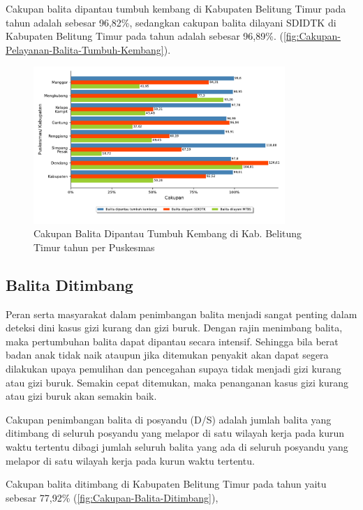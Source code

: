 Cakupan balita dipantau tumbuh kembang di Kabupaten Belitung Timur pada tahun \tP adalah sebesar 96,82\%, sedangkan cakupan balita dilayani SDIDTK di Kabupaten Belitung Timur pada tahun \tP adalah sebesar 96,89\%. (\autoref{fig:Cakupan-Pelayanan-Balita-Tumbuh-Kembang}).

\begin{figure}[H]
	\centering
	\includegraphics[width=0.85\textwidth]{bab_05/bab_05_23_balitaTumbuhKembang}
	\caption{Cakupan Balita Dipantau Tumbuh Kembang di Kab. Belitung Timur tahun \tP per Puskesmas}
	\label{fig:Cakupan-Pelayanan-Balita-Tumbuh-Kembang}
\end{figure}

\subsection{Balita Ditimbang}
\label{subsec:Balita-Ditimbang}
Peran serta masyarakat dalam penimbangan balita menjadi sangat penting
dalam deteksi dini kasus gizi kurang dan gizi buruk. Dengan rajin
menimbang balita, maka pertumbuhan balita dapat dipantau secara intensif.
Sehingga bila berat badan anak tidak naik ataupun jika ditemukan penyakit
akan dapat segera dilakukan upaya pemulihan dan pencegahan supaya
tidak menjadi gizi kurang atau gizi buruk. Semakin cepat ditemukan,
maka penanganan kasus gizi kurang atau gizi buruk akan semakin baik.\par

Cakupan penimbangan balita di posyandu (D/S) adalah jumlah balita
yang ditimbang di seluruh posyandu yang melapor di satu wilayah kerja
pada kurun waktu tertentu dibagi jumlah seluruh balita yang ada di
seluruh posyandu yang melapor di satu wilayah kerja pada kurun waktu
tertentu.

Cakupan balita ditimbang di Kabupaten Belitung Timur pada tahun \tP yaitu sebesar 77,92\% (\autoref{fig:Cakupan-Balita-Ditimbang}), %

